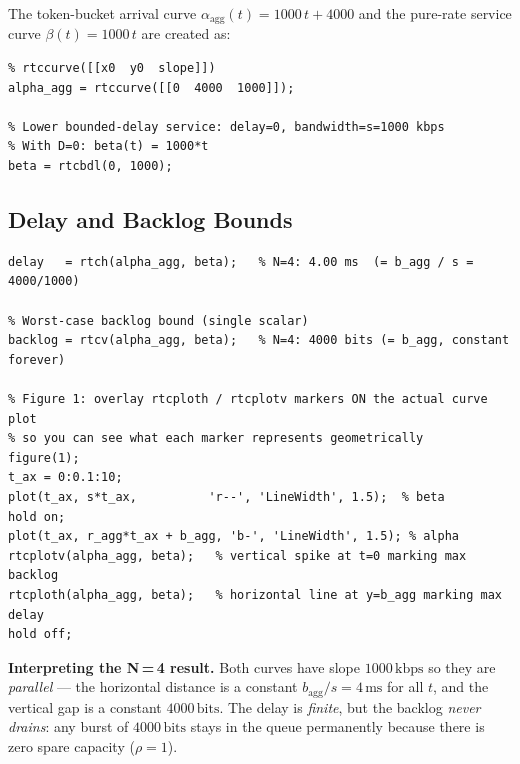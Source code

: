 \documentclass[12pt, a4paper]{article}
\begin{document}
The token-bucket arrival curve $\alpha_\text{agg}(t) = 1000\,t + 4000$
and the pure-rate service curve $\beta(t) = 1000\,t$ are created as:

\begin{lstlisting}[style=matlab]
% Token bucket: starts at y = b_agg, rises with slope r_agg
% rtccurve([[x0  y0  slope]])
alpha_agg = rtccurve([[0  4000  1000]]);

% Lower bounded-delay service: delay=0, bandwidth=s=1000 kbps
% With D=0: beta(t) = 1000*t
beta = rtcbdl(0, 1000);
\end{lstlisting}

\subsection*{Delay and Backlog Bounds}

\begin{lstlisting}[style=matlab]
% Worst-case delay bound (single scalar)
delay   = rtch(alpha_agg, beta);   % N=4: 4.00 ms  (= b_agg / s = 4000/1000)

% Worst-case backlog bound (single scalar)
backlog = rtcv(alpha_agg, beta);   % N=4: 4000 bits (= b_agg, constant forever)

% Figure 1: overlay rtcploth / rtcplotv markers ON the actual curve plot
% so you can see what each marker represents geometrically
figure(1);
t_ax = 0:0.1:10;
plot(t_ax, s*t_ax,          'r--', 'LineWidth', 1.5);  % beta
hold on;
plot(t_ax, r_agg*t_ax + b_agg, 'b-', 'LineWidth', 1.5); % alpha
rtcplotv(alpha_agg, beta);   % vertical spike at t=0 marking max backlog
rtcploth(alpha_agg, beta);   % horizontal line at y=b_agg marking max delay
hold off;
\end{lstlisting}

\begin{notebox}
  \textbf{Interpreting the N\,=\,4 result.}
  Both curves have slope $1000\,\text{kbps}$ so they are \emph{parallel} ---
  the horizontal distance is a constant $b_\text{agg}/s = 4\,\text{ms}$ for all $t$,
  and the vertical gap is a constant $4000\,\text{bits}$.
  The delay is \emph{finite}, but the backlog \emph{never drains}: any burst of
  $4000\,\text{bits}$ stays in the queue permanently because there is zero spare
  capacity ($\rho = 1$).
\end{notebox}

\end{document}
